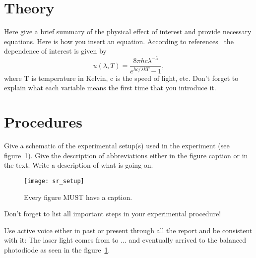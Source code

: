 \documentclass[letterpaper,12pt]{article}
\begin{document}
\section{Theory}

Here give a brief summary of the physical effect of interest and provide
necessary equations. Here is how you insert an equation. According to
references~\cite{melissinos, Cyr, Wiki} the dependence of interest is given
by
\begin{equation} \label{eq:aperp} %
u(\lambda,T)=\frac{8\pi hc\lambda^{-5}}{e^{hc/\lambda kT}-1},
\end{equation}
where T is temperature in Kelvin, c is the speed of light, etc. Don't forget to
explain what each variable means the first time that you introduce it.


\section{Procedures}

Give a schematic of the experimental setup(s) used in the experiment (see
figure~\ref{fig:samplesetup}). Give the description of  abbreviations
either in the figure caption or in the text. Write a description of what is
going on. 

\begin{figure}[ht] 
        \centering \texttt{[image: sr\_setup]}
        \caption{
                \label{fig:samplesetup} %
                Every figure MUST have a caption.
        }
\end{figure}

Don't forget to list all important steps in your experimental procedure!

Use active voice either in past or present through all the report and be
consistent with it:
The laser light comes  from to ... and eventually arrived to the
balanced photodiode as seen in the figure~\ref{fig:samplesetup}.
\end{document}
